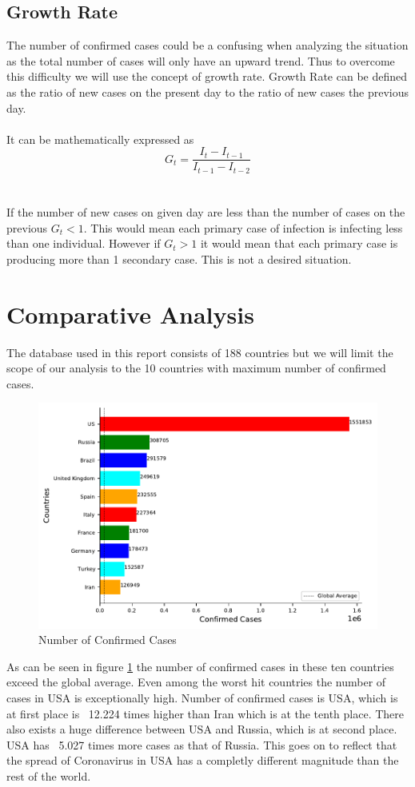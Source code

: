 \documentclass[12pt, twosided]{report}  %
\begin{document}
\subsection*{Growth Rate}
The number of confirmed cases could be a confusing when analyzing the situation as the total number of cases will only  have an upward trend. Thus to overcome this difficulty we will use the concept of growth rate. Growth Rate can be defined as the ratio of new cases on the present day to the ratio of new cases the previous day.
\\
\\
It can be mathematically expressed as 
$$ G_t = \frac{I_t - I_{t-1}}{I_{t-1}-I_{t-2}}$$
\\ 
\\
If the number of new cases on given day are less than the number of cases on the previous $G_t < 1$. This would mean each primary case of infection is infecting less than one individual. However if $G_t > 1$ it would mean that each primary case is producing more than 1 secondary case. This is not a desired situation.

\section{Comparative Analysis}
The database used in this report consists of 188 countries but we will limit the scope of our analysis to the 10 countries with maximum number of confirmed cases.

\begin{figure}[H]
\centering
	\includegraphics[width=0.5\linewidth]{./images/plot-1.pdf}
	\caption{Number of Confirmed Cases}
	\label{plot_confirmedcases}
\end{figure}

As can be seen in figure \ref{plot_confirmedcases} the number of confirmed cases in these ten countries exceed the global average. Even among the worst hit countries the number of cases in USA is exceptionally high. Number of confirmed cases is USA, which is at first place is ~12.224 times higher than Iran which is at the tenth place. There also exists a huge difference between USA and Russia, which is at second place. USA has ~5.027 times more cases as that of Russia. This goes on to reflect that the spread of Coronavirus in USA has a completly different magnitude than the rest of the world. 
\end{document}
